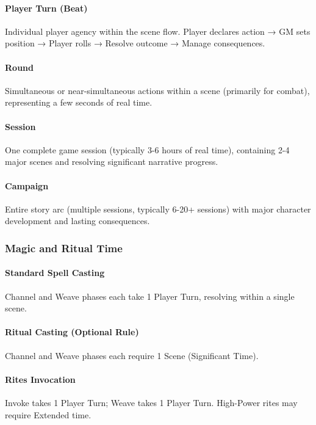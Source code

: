 \documentclass[11pt]{article}
\begin{document}
\paragraph{Player Turn (Beat)}
Individual player agency within the scene flow. Player declares action → GM sets position → Player rolls → Resolve outcome → Manage consequences.

\paragraph{Round}
Simultaneous or near-simultaneous actions within a scene (primarily for combat), representing a few seconds of real time.

\paragraph{Session}
One complete game session (typically 3-6 hours of real time), containing 2-4 major scenes and resolving significant narrative progress.

\paragraph{Campaign}
Entire story arc (multiple sessions, typically 6-20+ sessions) with major character development and lasting consequences.

\subsubsection{Magic and Ritual Time}

\paragraph{Standard Spell Casting}
Channel and Weave phases each take 1 Player Turn, resolving within a single scene.

\paragraph{Ritual Casting (Optional Rule)}
Channel and Weave phases each require 1 Scene (Significant Time).

\paragraph{Rites Invocation}
Invoke takes 1 Player Turn; Weave takes 1 Player Turn. High-Power rites may require Extended time.
\end{document}

